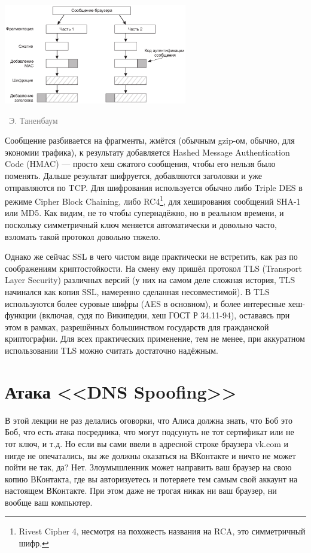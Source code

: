 \documentclass[a5paper]{article}
\newcommand{\attribution}[1] {
\vspace{-5mm}\begin{flushright}\begin{scriptsize}\textcolor{gray}{\textcopyright\, #1}\end{scriptsize}\end{flushright}
}
\begin{document}
\begin{center}
    \includegraphics[width=0.6\textwidth]{sslCommunication.png}
    \attribution{Э. Таненбаум}
\end{center}

Сообщение разбивается на фрагменты, жмётся (обычным gzip-ом, обычно, для экономии трафика), к результату добавляется Hashed Message Authentication Code (HMAC) --- просто хеш сжатого сообщения, чтобы его нельзя было поменять. Дальше результат шифруется, добавляются заголовки и уже отправляются по TCP. Для шифрования используется обычно либо Triple DES в режиме Cipher Block Chaining, либо RC4\footnote{Rivest Cipher 4, несмотря на похожесть названия на RCA, это симметричный шифр.}, для хеширования сообщений SHA-1 или MD5. Как видим, не то чтобы супернадёжно, но в реальном времени, и поскольку симметричный ключ меняется автоматически и довольно часто, взломать такой протокол довольно тяжело.

Однако же сейчас SSL в чего чистом виде практически не встретить, как раз по соображениям криптостойкости. На смену ему пришёл протокол TLS (Transport Layer Security) различных версий (у них на самом деле сложная история, TLS начинался как копия SSL, намеренно сделанная несовместимой). В TLS используются более суровые шифры (AES в основном), и более интересные хеш-функции (включая, судя по Википедии, хеш ГОСТ Р 34.11-94), оставаясь при этом в рамках, разрешённых большинством государств для гражданской криптографии. Для всех практических применение, тем не менее, при аккуратном использовании TLS можно считать достаточно надёжным.

\section{Атака <<DNS Spoofing>>}

В этой лекции не раз делались оговорки, что Алиса должна знать, что Боб это Боб, что есть атака посредника, что могут подсунуть не тот сертификат или не тот ключ, и т.д. Но если вы сами ввели в адресной строке браузера vk.com и нигде не опечатались, вы же должны оказаться на ВКонтакте и ничто не может пойти не так, да? Нет. Злоумышленник может направить ваш браузер на свою копию ВКонтакта, где вы авторизуетесь и потеряете тем самым свой аккаунт на настоящем ВКонтакте. При этом даже не трогая никак ни ваш браузер, ни вообще ваш компьютер. 
\end{document}
